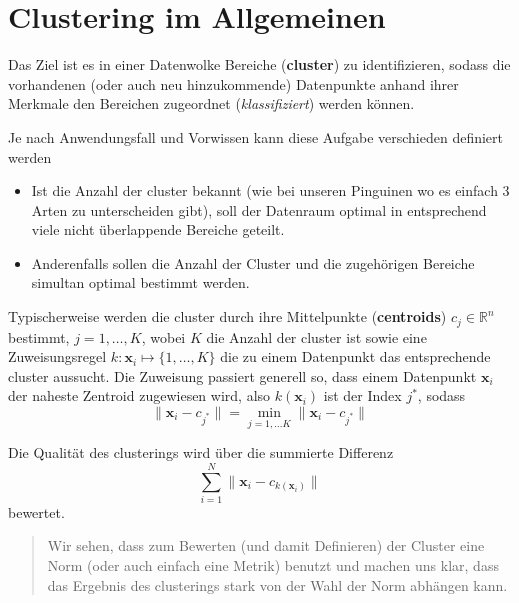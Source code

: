 \documentclass[]{book}
\providecommand{\tightlist}{%
  \setlength{\itemsep}{0pt}\setlength{\parskip}{0pt}}
\newenvironment {JHSAYS} [0] {\begin{quote}\color{jhsc}} {\end{quote}}
\theoremstyle{definition}
\theoremstyle{definition}
\theoremstyle{definition}
\theoremstyle{definition}
\theoremstyle{remark}
\begin{document}
\hypertarget{clustering-im-allgemeinen}{%
\section{Clustering im Allgemeinen}\label{clustering-im-allgemeinen}}

Das Ziel ist es in einer Datenwolke Bereiche (\textbf{cluster}) zu identifizieren, sodass die vorhandenen (oder auch neu hinzukommende) Datenpunkte anhand ihrer Merkmale den Bereichen zugeordnet (\emph{klassifiziert}) werden können.

Je nach Anwendungsfall und Vorwissen kann diese Aufgabe verschieden definiert werden

\begin{itemize}
\tightlist
\item
  Ist die Anzahl der cluster bekannt (wie bei unseren Pinguinen wo es einfach 3 Arten zu unterscheiden gibt), soll der Datenraum optimal in entsprechend viele nicht überlappende Bereiche geteilt.
\item
  Anderenfalls sollen die Anzahl der Cluster und die zugehörigen Bereiche simultan optimal bestimmt werden.
\end{itemize}

Typischerweise werden die cluster durch ihre Mittelpunkte (\textbf{centroids}) \(c_j\in \mathbb R^{n}\) bestimmt, \(j=1,\dots,K\), wobei \(K\) die Anzahl der cluster ist sowie eine Zuweisungsregel \(k\colon {\mathbf{x} _ i}\mapsto \{1,\dots,K\}\) die zu einem Datenpunkt das entsprechende cluster aussucht. Die Zuweisung passiert generell so, dass einem Datenpunkt \({\mathbf{x} _ i}\) der naheste Zentroid zugewiesen wird, also \(k({\mathbf{x} _ i})\) ist der Index \(j^*\), sodass
\begin{equation*}
\|{\mathbf{x} _ i}- c_{j^*}\| = \min_{j=1,\dots K} \|{\mathbf{x} _ i}- c_{j^*}\|
\end{equation*}

Die Qualität des clusterings wird über die summierte Differenz
\begin{equation*}
\sum_{i=1}^N\|{\mathbf{x} _ i}- c_{k({\mathbf{x} _ i})}\|
\end{equation*}
bewertet.

\leavevmode\hypertarget{cluster-norms}{}%
\begin{JHSAYS}
Wir sehen, dass zum Bewerten (und damit Definieren) der Cluster eine Norm (oder auch einfach eine Metrik) benutzt und machen uns klar, dass das Ergebnis des clusterings stark von der Wahl der Norm abhängen kann.

\end{JHSAYS}
\end{document}
